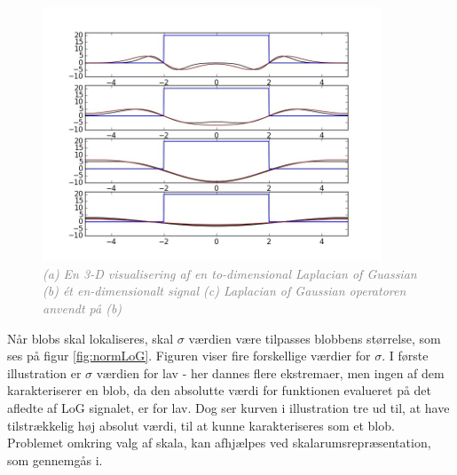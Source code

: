 \begin{figure}[H]
    \centering
    \includegraphics[width=0.90\textwidth]{fig/normLoG.jpg}
    \vspace{-0.5em}   
    \begin{center}
    \caption{\textcolor{gray}{\footnotesize \textit{
    (a) En 3-D visualisering af en to-dimensional Laplacian of Guassian (b) ét en-dimensionalt signal (c) Laplacian of Gaussian operatoren anvendt på (b)}}}
    \label{fig:normLoG}
     \end{center}
  \end{figure}
       \vspace{-2.5em}
\noindent
Når blobs skal lokaliseres, skal $\sigma$ værdien være tilpasses blobbens størrelse, som ses på figur \eqref{fig:normLoG}. Figuren viser fire forskellige værdier for $\sigma$. I første illustration er $\sigma$ værdien for lav - her dannes flere ekstremaer, men ingen af dem karakteriserer en blob, da den absolutte værdi for funktionen evalueret på det afledte af LoG signalet, er for lav. Dog ser kurven i illustration tre ud til, at have tilstrækkelig høj absolut værdi, til at kunne karakteriseres som et blob. \\
Problemet omkring valg af skala, kan afhjælpes ved skalarumsrepræsentation, som gennemgås i.

